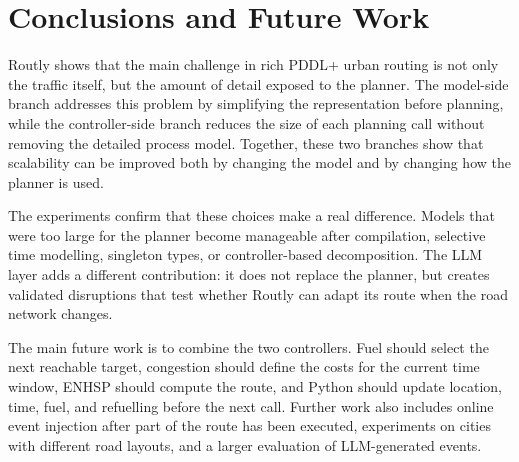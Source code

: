 \documentclass[10pt]{article}
\begin{document}
\section{Conclusions and Future Work}

Routly shows that the main challenge in rich PDDL+ urban routing is not only
the traffic itself, but the amount of detail exposed to the planner. The
model-side branch addresses this problem by simplifying the representation
before planning, while the controller-side branch reduces the size of each
planning call without removing the detailed process model. Together, these two
branches show that scalability can be improved both by changing the model and
by changing how the planner is used.

The experiments confirm that these choices make a real difference. Models that
were too large for the planner become manageable after compilation, selective
time modelling, singleton types, or controller-based decomposition. The LLM
layer adds a different contribution: it does not replace the planner, but
creates validated disruptions that test whether Routly can adapt its route
when the road network changes.

The main future work is to combine the two controllers. Fuel should select the
next reachable target, congestion should define the costs for the current time
window, ENHSP should compute the route, and Python should update location, time,
fuel, and refuelling before the next call. Further work also includes online
event injection after part of the route has been executed, experiments on cities
with different road layouts, and a larger evaluation of LLM-generated events.

\vspace{2em}
\end{document}
